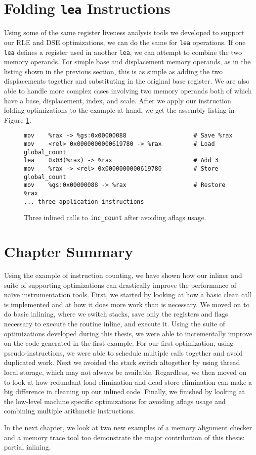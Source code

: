 \section{Folding {\tt lea} Instructions}
\label{sec:fold_lea}

Using some of the same register liveness analysis tools we developed to support
our RLE and DSE optimizations, we can do the same for {\tt lea} operations.  If
one {\tt lea} defines a register used in another {\tt lea}, we can attempt to
combine the two memory operands.  For simple base and displacement memory
operands, as in the listing shown in the previous section, this is as simple as
adding the two displacements together and substituting in the original base
register.  We are also able to handle more complex cases involving two memory
operands both of which have a base, displacement, index, and scale.  After we
apply our instruction folding optimizations to the example at hand, we get the
assembly listing in Figure \ref{fig:inscount_lea}.

\begin{figure}
\begin{verbatim}
mov    %rax -> %gs:0x00000088                   # Save %rax
mov    <rel> 0x0000000000619780 -> %rax         # Load global_count
lea    0x03(%rax) -> %rax                       # Add 3
mov    %rax -> <rel> 0x0000000000619780         # Store global_count
mov    %gs:0x00000088 -> %rax                   # Restore %rax
... three application instructions
\end{verbatim}
\caption{Three inlined calls to {\tt inc\_count} after avoiding aflags usage.}
\label{fig:inscount_lea}
\end{figure}

\section{Chapter Summary}

Using the example of instruction counting, we have shown how our inliner and
suite of supporting optimizations can drastically improve the performance of
na\"ive instrumentation tools.  First, we started by looking at how a basic
clean call is implemented and at how it does more work than is necessary.  We
moved on to do basic inlining, where we switch stacks, save only the registers
and flags necessary to execute the routine inline, and execute it.  Using the
suite of optimizations developed during this thesis, we were able to
incrementally improve on the code generated in the first example.  For our first
optimization, using pseudo-instructions, we were able to schedule multiple calls
together and avoid duplicated work.  Next we avoided the stack switch altogether
by using thread local storage, which may not always be available.  Regardless,
we then moved on to look at how redundant load elimination and dead store
elimination can make a big difference in cleaning up our inlined code.  Finally,
we finished by looking at the low-level machine specific optimizations for
avoiding aflags usage and combining multiple arithmetic instructions.

In the next chapter, we look at two new examples of a memory alignment checker
and a memory trace tool too demonstrate the major contribution of this thesis:
partial inlining.
